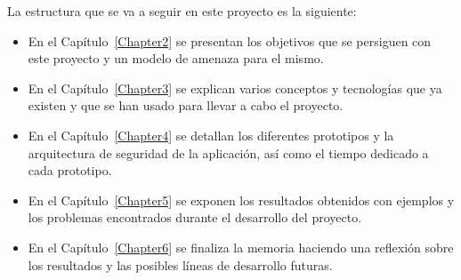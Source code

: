 La estructura que se va a seguir en este proyecto es la siguiente:

\begin{itemize}
  \item En el Capítulo~\ref{Chapter2} se presentan los objetivos que se persiguen con este proyecto y un modelo de amenaza para el mismo.
  \item En el Capítulo~\ref{Chapter3} se explican varios conceptos y tecnologías que ya existen y que se han usado para llevar a cabo el proyecto.
  \item En el Capítulo~\ref{Chapter4} se detallan los diferentes prototipos y la arquitectura de seguridad de la aplicación, así como el tiempo dedicado a cada prototipo.
  \item En el Capítulo~\ref{Chapter5} se exponen los resultados obtenidos con ejemplos y los problemas encontrados durante el desarrollo del proyecto.
  \item En el Capítulo~\ref{Chapter6} se finaliza la memoria haciendo una reflexión sobre los resultados y las posibles líneas de desarrollo futuras.
\end{itemize}
